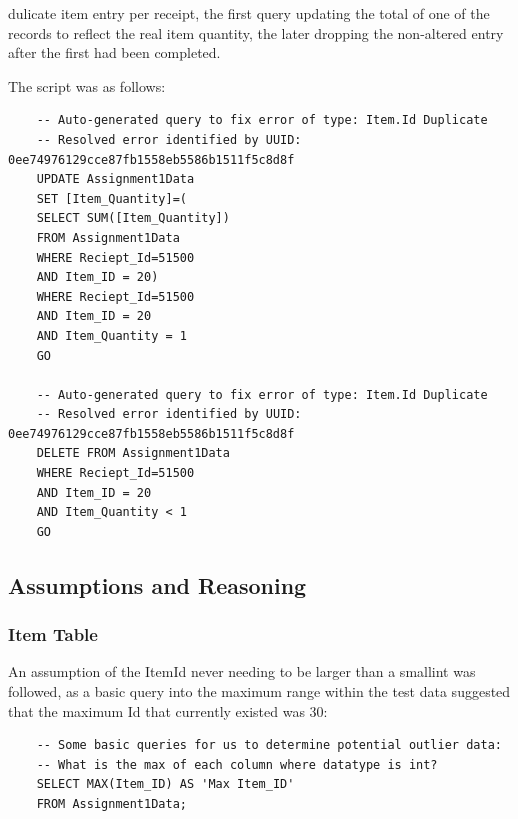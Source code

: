 \documentclass{article}
\begin{document}
            dulicate item entry per receipt, the first query updating the total of one of the 
            records to reflect the real item quantity, the later dropping the non-altered 
            entry after the first had been completed.
            \par
            The script was as follows:
            \begin{verbatim}
    -- Auto-generated query to fix error of type: Item.Id Duplicate
    -- Resolved error identified by UUID: 0ee74976129cce87fb1558eb5586b1511f5c8d8f
    UPDATE Assignment1Data 
    SET [Item_Quantity]=(
    SELECT SUM([Item_Quantity])
    FROM Assignment1Data
    WHERE Reciept_Id=51500
    AND Item_ID = 20)
    WHERE Reciept_Id=51500
    AND Item_ID = 20
    AND Item_Quantity = 1
    GO

    -- Auto-generated query to fix error of type: Item.Id Duplicate
    -- Resolved error identified by UUID: 0ee74976129cce87fb1558eb5586b1511f5c8d8f
    DELETE FROM Assignment1Data 
    WHERE Reciept_Id=51500
    AND Item_ID = 20
    AND Item_Quantity < 1
    GO
            \end{verbatim}
        \newpage
        \subsection{Assumptions and Reasoning}
        \label{sec:AR}
            \subsubsection{Item Table}
                An assumption of the ItemId never needing to be larger than a smallint
                was followed, as a basic query into the maximum range within the test data
                suggested that the maximum Id that currently existed was 30:
                \begin{verbatim}
    -- Some basic queries for us to determine potential outlier data:
    -- What is the max of each column where datatype is int?
    SELECT MAX(Item_ID) AS 'Max Item_ID'
    FROM Assignment1Data;
                \end{verbatim}
\end{document}
